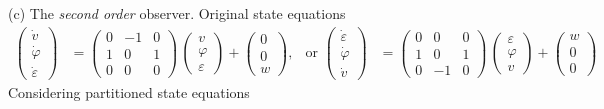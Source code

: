 (c) The \emph{second order} observer. 
Original state equations
\begin{align*}
    \begin{pmatrix}
        \dot v \\ \dot \varphi \\ \dot \varepsilon
    \end{pmatrix} &= \begin{pmatrix}
        0 & -1 & 0 \\ 1 & 0 & 1 \\ 0 & 0 & 0
    \end{pmatrix}\,\begin{pmatrix}
        v \\ \varphi \\ \varepsilon
    \end{pmatrix} + \begin{pmatrix}
        0 \\ 0 \\ w
    \end{pmatrix}, &  
    \text{or } \begin{pmatrix}
        \dot \varepsilon \\ \dot \varphi \\ \dot v 
    \end{pmatrix} &= \begin{pmatrix}
        0 & 0 & 0 \\ 1 & 0 & 1 \\ 0 & -1 & 0
    \end{pmatrix}\,\begin{pmatrix}
        \varepsilon \\ \varphi \\ v
    \end{pmatrix} + \begin{pmatrix}
        w \\ 0 \\ 0
    \end{pmatrix}
\end{align*}
Considering partitioned state equations 
